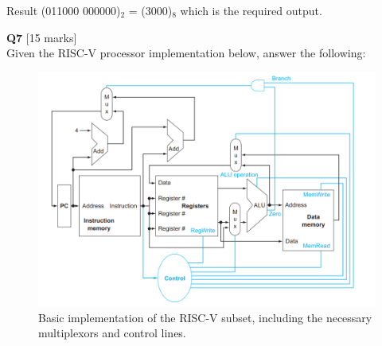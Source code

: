 \documentclass[addpoints]{exam}
\begin{document}
\begin{sloppypar}
\begin{questions}
\begin{solution}
        Result (011000 000000)$_2$ = (3000)$_8$ which is the required output.
    \end{solution}
\pagebreak
    \question[15]\textbf{Q7} [15 marks] \\ 
    Given the RISC-V processor implementation below, answer the following: 
    \begin{figure}[h]
        \begin{center}
            \includegraphics[scale = 0.5]{q7_fig.png}
            \caption{Basic implementation of the RISC-V subset, including the necessary multiplexors and control lines.}
        \end{center}
    \end{figure}
    \begin{solution}
        \begin{parts}

\end{parts}
\end{solution}
\end{questions}
\end{sloppypar}
\end{document}
